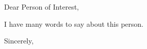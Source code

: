 \documentclass[letterpaper,12pt]{letter}
\begin{document}
\begin{letter}{}


\singlespacing

\opening{Dear Person of Interest,}

I have many words to say about this person.

\begin{center}

\closing{Sincerely,\\
\vspace{10pt}
 \\
}

\end{center}




\end{letter}
\end{document}
